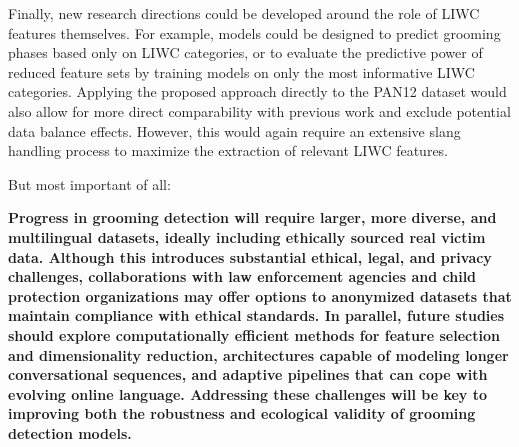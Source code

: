Finally, new research directions could be developed around the role of LIWC features themselves. For example, models could be designed to predict grooming phases based only on LIWC categories, or to evaluate the predictive power of reduced feature sets by training models on only the most informative LIWC categories. Applying the proposed approach directly to the PAN12 dataset would also allow for more direct comparability with previous work and exclude potential data balance effects. However, this would again require an extensive slang handling process to maximize the extraction of relevant LIWC features.


But most important of all:
 
\textbf{Progress in grooming detection will require larger, more diverse, and multilingual datasets, ideally including ethically sourced real victim data. Although this introduces substantial ethical, legal, and privacy challenges, collaborations with law enforcement agencies and child protection organizations may offer options to anonymized datasets that maintain compliance with ethical standards. In parallel, future studies should explore computationally efficient methods for feature selection and dimensionality reduction, architectures capable of modeling longer conversational sequences, and adaptive pipelines that can cope with evolving online language. Addressing these challenges will be key to improving both the robustness and ecological validity of grooming detection models.}  








